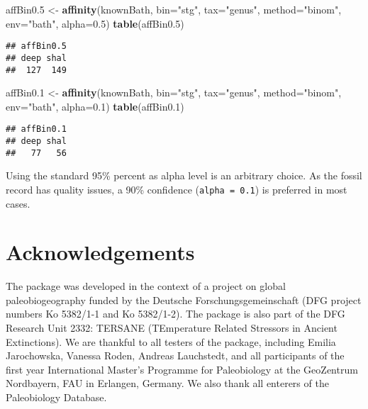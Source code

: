 \documentclass[]{article}
\newenvironment{Shaded}{\begin{snugshade}}{\end{snugshade}}
\newcommand{\KeywordTok}[1]{\textcolor[rgb]{0.13,0.29,0.53}{\textbf{{#1}}}}
\newcommand{\DataTypeTok}[1]{\textcolor[rgb]{0.13,0.29,0.53}{{#1}}}
\newcommand{\FloatTok}[1]{\textcolor[rgb]{0.00,0.00,0.81}{{#1}}}
\newcommand{\StringTok}[1]{\textcolor[rgb]{0.31,0.60,0.02}{{#1}}}
\newcommand{\NormalTok}[1]{{#1}}
\begin{document}
\begin{Shaded}
\begin{Highlighting}[]
\NormalTok{affBin0}\FloatTok{.5} \NormalTok{<-}\StringTok{ }\KeywordTok{affinity}\NormalTok{(knownBath, }\DataTypeTok{bin=}\StringTok{"stg"}\NormalTok{, }\DataTypeTok{tax=}\StringTok{"genus"}\NormalTok{, }
  \DataTypeTok{method=}\StringTok{"binom"}\NormalTok{, }\DataTypeTok{env=}\StringTok{"bath"}\NormalTok{, }\DataTypeTok{alpha=}\FloatTok{0.5}\NormalTok{)}
\KeywordTok{table}\NormalTok{(affBin0}\FloatTok{.5}\NormalTok{)}
\end{Highlighting}
\end{Shaded}

\begin{verbatim}
## affBin0.5
## deep shal 
##  127  149
\end{verbatim}

\begin{Shaded}
\begin{Highlighting}[]
\NormalTok{affBin0}\FloatTok{.1} \NormalTok{<-}\StringTok{ }\KeywordTok{affinity}\NormalTok{(knownBath, }\DataTypeTok{bin=}\StringTok{"stg"}\NormalTok{, }\DataTypeTok{tax=}\StringTok{"genus"}\NormalTok{, }
  \DataTypeTok{method=}\StringTok{"binom"}\NormalTok{, }\DataTypeTok{env=}\StringTok{"bath"}\NormalTok{, }\DataTypeTok{alpha=}\FloatTok{0.1}\NormalTok{)}
\KeywordTok{table}\NormalTok{(affBin0}\FloatTok{.1}\NormalTok{)}
\end{Highlighting}
\end{Shaded}

\begin{verbatim}
## affBin0.1
## deep shal 
##   77   56
\end{verbatim}

Using the standard 95\% percent as alpha level is an arbitrary choice.
As the fossil record has quality issues, a 90\% confidence
(\texttt{alpha\ =\ 0.1}) is preferred in most cases.

\section{Acknowledgements}\label{acknowledgements}

The package was developed in the context of a project on global
paleobiogeography funded by the Deutsche Forschungsgemeinschaft (DFG
project numbers Ko 5382/1-1 and Ko 5382/1-2). The package is also part
of the DFG Research Unit 2332: TERSANE (TEmperature Related Stressors in
Ancient Extinctions). We are thankful to all testers of the package,
including Emilia Jarochowska, Vanessa Roden, Andreas Lauchstedt, and all
participants of the first year International Master's Programme for
Paleobiology at the GeoZentrum Nordbayern, FAU in Erlangen, Germany. We
also thank all enterers of the Paleobiology Database.
\end{document}
